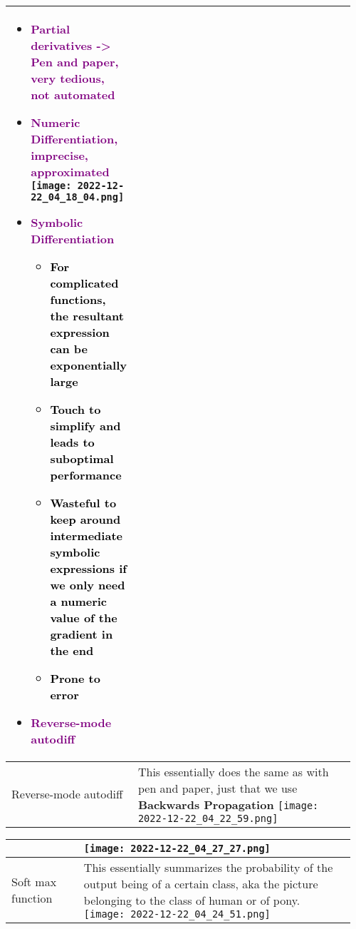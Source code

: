 \documentclass[main.tex,fontsize=8pt,paper=a4,paper=portrait,DIV=calc,]{scrartcl}
\begin{document}
\begin{table}[ht!]
\begin{tabular}{|m{0.2\linewidth}|m{0.755\linewidth}|}
\begin{itemize}
\item \textcolor{purple}{Partial derivatives -> Pen and paper, very tedious, not automated}
\item \textcolor{purple}{Numeric Differentiation, imprecise, approximated}\newline
\texttt{[image: 2022-12-22\_04\_18\_04.png]}
\item \textcolor{purple}{Symbolic Differentiation}\newline
  \begin{itemize}
  \item \textcolor{black}{For complicated functions, the resultant expression can be exponentially large}
  \item \textcolor{black}{Touch to simplify and leads to suboptimal performance}
  \item \textcolor{black}{Wasteful to keep around intermediate symbolic expressions if we only need a numeric value of the gradient in the end}
  \item \textcolor{black}{Prone to error}
  \end{itemize} 
\item \textcolor{purple}{Reverse-mode autodiff}
\vspace{-3mm}
\end{itemize} 
\\
\hline
Reverse-mode autodiff  & 
This essentially does the same as with pen and paper, just that we use \textbf{Backwards Propagation}\newline
\texttt{[image: 2022-12-22\_04\_22\_59.png]}
\\
\hline
\end{tabular}
\end{table}
\pagebreak
\begin{table}[ht!]
\begin{tabular}{|m{0.2\linewidth}|m{0.755\linewidth}|}
\hline
&
\vspace{2mm}
\texttt{[image: 2022-12-22\_04\_27\_27.png]}\\
\hline
Soft max function & 
This essentially summarizes the probability of the output being of a certain class, aka the picture belonging to the class of human or of pony.\newline
\texttt{[image: 2022-12-22\_04\_24\_51.png]}
\\
\hline
\end{tabular}
\end{table}
\end{document}

